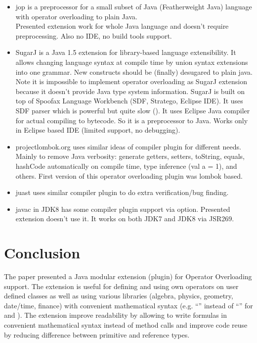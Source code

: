 \documentclass{aircc}
\begin{document}
\begin{itemize}
\item jop\cite{jop}
is a preprocessor for a small subset of Java (Featherweight Java) language with operator overloading to plain Java. \\
Presented extension work for whole Java language and doesn't require preprocessing.
Also no IDE, no build tools support.
\item SugarJ\cite{sugarj}
is a Java 1.5 extension for library-based language extensibility. 
It allows changing language syntax at compile time by union syntax extensions into one grammar.
New constructs should be (finally) desugared to plain java.
Note it is impossible to implement operator overloading as SugarJ extension because it doesn't provide Java type system information.
SugarJ is built on top of Spoofax Language Workbench (SDF, Stratego, Eclipse IDE).
It uses SDF parser which is powerful but quite slow ().
It uses Eclipse Java compiler for actual compiling to bytecode. So it is a preprocessor to Java.
Works only in Eclipse based IDE (limited support, no debugging).
\item projectlombok.org uses similar ideas of compiler plugin for different needs. 
Mainly to remove Java verbosity:
generate getters, setters, toString, equals, hashCode automatically on compile time, 
type inference (val a = 1), and others.
First version of this operator overloading plugin was lombok based\cite{lombok-oo}.
\item juast\cite{juast} uses similar compiler plugin to do extra verification/bug finding.
\item javac in JDK8 has some compiler plugin support via  option\cite{Xplugin}.
Presented extension doesn't use it. It works on both JDK7 and JDK8 via JSR269.
\end{itemize}

\section{Conclusion}
The paper presented a Java modular extension (plugin) for
Operator Overloading support. 
The extension is useful for
 defining and using own operators on user defined classes
 as well as using various libraries (algebra, physics, geometry, date/time, finance) 
  with convenient mathematical syntax
  (e.g. ``'' instead of ``'' for  and ).
The extension improve readability by allowing to write formulas in convenient mathematical syntax
instead of method calls and improve code reuse by reducing difference between primitive and reference types.
\end{document}
